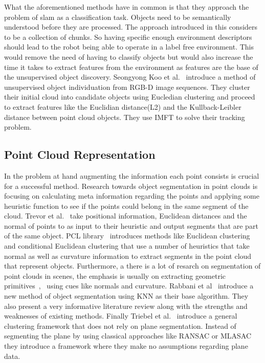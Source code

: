 \documentclass[twoside]{article}
\begin{document}
\begin{multicols}{2}
What the aforementioned methods have in common is that they approach the problem of slam as a classification task. Objects need to be semantically understood before they are processed. The approach introduced in this considers to be a collection of chunks. So having specific enough environment descriptors should lead to the robot being able to operate in a label free environment. This would remove the need of having to classify objects but would also increase the time it takes to extract features from the environment as features are the base of the unsupervised object discovery.
Seongyong Koo et al.~\cite{objectDisc} introduce a method of unsupervised object individuation from RGB-D image sequences. They cluster their initial cloud into candidate objects using Eucledian clustering and proceed to extract features like the Euclidian distance(L2) and the Kullback-Leibler distance between point cloud objects. They use IMFT to solve their tracking problem.

\subsection{Point Cloud Representation}

In the problem at hand augmenting the information each point consists is crucial for a successful method. Research towards object segmentation in point clouds is focusing on calculating meta information regarding the points and applying some heuristic function to see if the points could belong in the same segment of the cloud. Trevor et al.~\cite{pointSeg} take positional information, Euclidean distances and the normal of points to as input to their heuristic and output segments that are part of the same object. PCL library~\cite{pcl} introduces methods like Euclidean clustering and conditional Euclidean clustering that use a number of heuristics that take normal as well as curvature information to extract segments in the point cloud that represent objects. Furthermore, a there is a lot of resarch on segmentation of point clouds in scenes, the emphasis is usually on extracting geometric primitives~\cite{planarSeg},~\cite{planarSeg2} using cues like normals and curvature. Rabbani et al~\cite{segOverview} introduce a new method of object segmentation using KNN as their base algorithm. They also present a very informative literature review along with the strengths and weaknesses of existing methods. Finally Triebel et al.~\cite{smartSeg} introduce a general clustering framework that does not rely on plane segmentation. Instead of segmenting the plane by using classical approaches like RANSAC or MLASAC they introduce a framework where they make no assumptions regarding plane data. 


\end{multicols}
\end{document}
